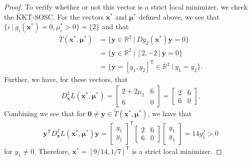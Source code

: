 \documentclass[12pt]{article}
\theoremstyle{definition}
\newcommand{\vc}[1]{\boldsymbol{#1}}
\newcommand{\tran}{\mathsf{T}}
\begin{document}
\begin{proof}
  To verify whether or not this vector is a strict local minimizer, we check the KKT-SOSC.
  For the vectors $\vc{x}^*$ and $\vc{\mu}^*$ defined above, we see that $\{i\ |\ g_i(\vc{x}^*) = 0, \mu_i^* > 0\} = \{2\}$ and that
  \begin{align*}
    \widetilde{T}(\vc{x}^*, \vc{\mu}^*) &= \{\vc{y}\in\mathbb{R}^2 \ |\ Dg_2(\vc{x}^*)\vc{y} = 0\} \\
    &= \{\vc{y}\in\mathbb{R}^2 \ |\ [2, -2]\vc{y} = 0\} \\
    &= \{\vc{y} = [y_1, y_2]^\tran\in\mathbb{R}^2 \ |\ y_1 = y_2\}.
  \end{align*}
  Further, we have, for these vectors, that
  \begin{align*}
    D_{\vc{x}}^2L(\vc{x}^*, \vc{\mu}^*) = \begin{bmatrix}2 + 2\mu_1 & 6 \\ 6 & 0 \end{bmatrix} = \begin{bmatrix}2 & 6 \\ 6 & 0 \end{bmatrix}.
  \end{align*}
  Combining we see that for $\vc{0}\neq\vc{y}\in\widetilde{T}(\vc{x}^*, \vc{\mu}^*)$, we have that
  \begin{align*}
    \vc{y}^\tran D_{\vc{x}}^2L(\vc{x}^*, \vc{\mu}^*) \vc{y} =
    \begin{bmatrix}y_1 \\ y_1\end{bmatrix}^\tran
    \begin{bmatrix}2 & 6 \\ 6 & 0 \end{bmatrix}
    \begin{bmatrix}y_1 \\ y_1\end{bmatrix}
    = 14 y_1^2 > 0
  \end{align*}
  for $y_1 \neq 0$. Therefore, $\vc{x}^* = [9/14, 1/7]^\tran$ is
  a strict local minimizer.
\end{proof}
\newpage
\end{document}
